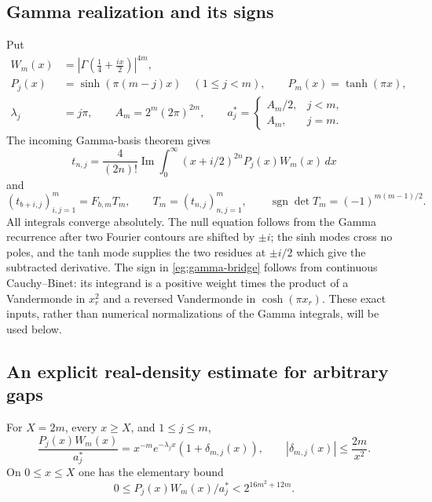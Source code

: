 \subsection{Gamma realization and its signs}

Put
\begin{align*}
 W_m(x)&=\left|\Gamma\!\left(\tfrac14+\tfrac{ix}{2}\right)\right|^{4m},\\
 P_j(x)&=\sinh(\pi(m-j)x)\quad(1\le j<m),\qquad
 P_m(x)=\tanh(\pi x),\\
 \lambda_j&=j\pi,\qquad A_m=2^m(2\pi)^{2m},\qquad
 a_j^*=\begin{cases}A_m/2,&j<m,\\ A_m,&j=m.
                   \end{cases}
\end{align*}
The incoming Gamma-basis theorem \cite{OrderedIncoming} gives
\begin{equation}\label{eg:gamma-coefficients}
 t_{n,j}=\frac4{(2n)!}\operatorname{Im}
       \int_0^\infty(x+i/2)^{2n}P_j(x)W_m(x)\,dx
\end{equation}
and
\begin{equation}\label{eg:gamma-bridge}
 (t_{b+i,j})_{i,j=1}^m=F_{b,m}T_m,\qquad
 T_m=(t_{n,j})_{n,j=1}^m,\qquad
 \operatorname{sgn}\det T_m=(-1)^{m(m-1)/2}.
\end{equation}
All integrals converge absolutely.  The null equation follows from
the Gamma recurrence after two Fourier contours are shifted by
$\pm i$; the sinh modes cross no poles, and the tanh mode supplies
the two residues at $\pm i/2$ which give the subtracted derivative.
The sign in \eqref{eg:gamma-bridge} follows from continuous
Cauchy--Binet: its integrand is a positive weight times the product
of a Vandermonde in $x_r^2$ and a reversed Vandermonde in
$\cosh(\pi x_r)$.  These exact inputs, rather than numerical
normalizations of the Gamma integrals, will be used below.

\subsection{An explicit real-density estimate for arbitrary gaps}

\begin{lemma}\label{eg:density}
For $X=2m$, every $x\ge X$, and $1\le j\le m$,
\begin{equation}\label{eg:density-bound}
 \frac{P_j(x)W_m(x)}{a_j^*}
   =x^{-m}e^{-\lambda_jx}(1+\delta_{m,j}(x)),
 \qquad |\delta_{m,j}(x)|\le\frac{2m}{x^2}.
\end{equation}
On $0\le x\le X$ one has the elementary bound
\begin{equation}\label{eg:compact-density}
 0\le P_j(x)W_m(x)/a_j^*<2^{16m^2+12m}.
\end{equation}
\end{lemma}

